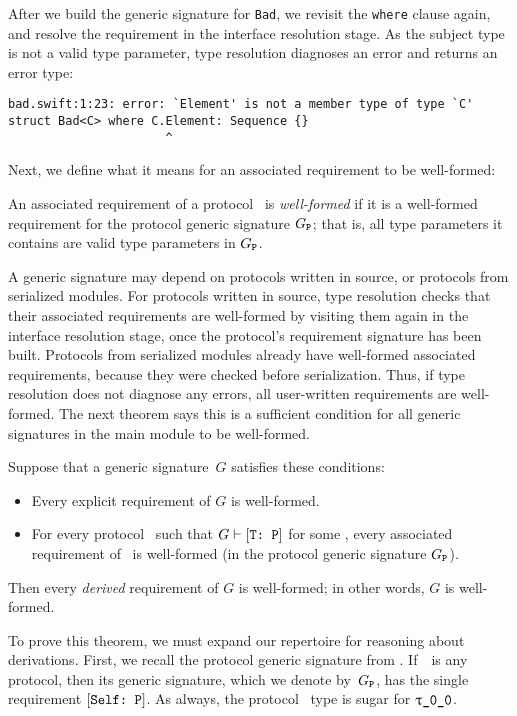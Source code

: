 \documentclass[../generics]{subfiles}
\begin{document}
After we build the generic signature for \texttt{Bad}, we revisit the \texttt{where} clause again, and resolve the requirement in the interface resolution stage. As the subject type is not a valid type parameter, type resolution diagnoses an error and returns an error type:
\begin{Verbatim}
bad.swift:1:23: error: `Element' is not a member type of type `C'
struct Bad<C> where C.Element: Sequence {}
                      ^
\end{Verbatim}

Next, we define what it means for an associated requirement to be well-formed:
\begin{definition}
An associated requirement of a protocol \tP\ is \emph{well-formed} if it is a well-formed requirement for the protocol generic signature $G_{\texttt{P}}$; that is, all type parameters it contains are valid type parameters in $G_{\texttt{P}}$.
\end{definition}

A generic signature may depend on protocols written in source, or protocols from serialized modules. For protocols written in source, type resolution checks that their associated requirements are well-formed by visiting them again in the interface resolution stage, once the protocol's requirement signature has been built. Protocols from serialized modules already have well-formed associated requirements, because they were checked before serialization. Thus, if type resolution does not diagnose any errors, all user-written requirements are well-formed. The next theorem says this is a sufficient condition for all generic signatures in the main module to be well-formed.

\begin{theorem}\label{valid theorem}
Suppose that a generic signature~$G$ satisfies these conditions:
\begin{itemize}
\item Every explicit requirement of $G$ is well-formed.
\item For every protocol \tP\ such that $G\vdash[\texttt{T:~P}]$ for some \tT, every associated requirement of \tP\ is well-formed (in the protocol generic signature $G_{\texttt{P}}$).
\end{itemize}
Then every \emph{derived} requirement of $G$ is well-formed; in other words, $G$ is well-formed.
\end{theorem}
To prove this theorem, we must expand our repertoire for reasoning about derivations. First, we recall the protocol generic signature from . If~\tP\ is any protocol, then its generic signature, which we denote by~$G_{\texttt{P}}$, has the single requirement $[\texttt{Self:~P}]$. As always, the protocol \tSelf\ type is sugar for $\rT$.
\end{document}
